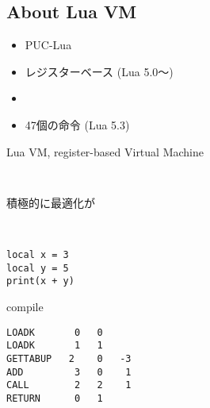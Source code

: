 \subsection{About Lua VM}
\begin{frame}
\frametitlesubs
\begin{itemize}
	\item PUC-Lua
	\item \alert{レジスターベース} (Lua 5.0〜)
	\item {}
	\item 47個の命令 (Lua 5.3)
\end{itemize}
\end{frame}
\begin{frame}[fragile]
\frametitlesec
\alert{Lua VM}, register-based Virtual Machine
\begin{figure}[H]
	\bgroup
	\footnotesize\tt

	\egroup
\end{figure}
\pause
\pause

積極的に最適化が

\bgroup
\small
\begin{minipage}{.1\textwidth}
\ 
\end{minipage}
\begin{minipage}{.3\textwidth}
\begin{lstlisting}[language={[5.3]lua}]
local x = 3
local y = 5
print(x + y)\end{lstlisting}
\end{minipage}
\begin{minipage}{.2\textwidth}
\begin{center}
\structure{$\Rightarrow$}

compile
\end{center}
\end{minipage}
\begin{minipage}{.35\textwidth}
	\begin{lstlisting}
LOADK       0   0
LOADK       1   1
GETTABUP   2    0   -3
ADD         3   0    1
CALL        2   2    1
RETURN      0   1\end{lstlisting}
\end{minipage}
\begin{minipage}{.1\textwidth}
\ 
\end{minipage}
\egroup


\end{frame}

